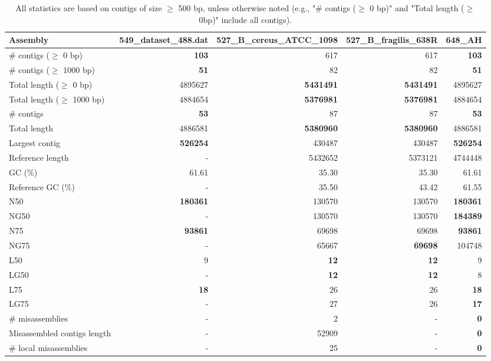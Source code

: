 \documentclass[12pt,a4paper]{article}
\begin{document}
\begin{table}[ht]
\begin{center}
\caption{All statistics are based on contigs of size $\geq$ 500 bp, unless otherwise noted (e.g., "\# contigs ($\geq$ 0 bp)" and "Total length ($\geq$ 0bp)" include all contigs).}
\begin{tabular}{|l*{4}{|r}|}
\hline
Assembly & 549\_dataset\_488.dat & 527\_B\_cereus\_ATCC\_1098 & 527\_B\_fragilis\_638R & 648\_AH \\ \hline
\# contigs ($\geq$ 0 bp) & {\bf 103} & 617 & 617 & {\bf 103} \\ \hline
\# contigs ($\geq$ 1000 bp) & {\bf 51} & 82 & 82 & {\bf 51} \\ \hline
Total length ($\geq$ 0 bp) & 4895627 & {\bf 5431491} & {\bf 5431491} & 4895627 \\ \hline
Total length ($\geq$ 1000 bp) & 4884654 & {\bf 5376981} & {\bf 5376981} & 4884654 \\ \hline
\# contigs & {\bf 53} & 87 & 87 & {\bf 53} \\ \hline
Total length & 4886581 & {\bf 5380960} & {\bf 5380960} & 4886581 \\ \hline
Largest contig & {\bf 526254} & 430487 & 430487 & {\bf 526254} \\ \hline
Reference length & - & 5432652 & 5373121 & 4744448 \\ \hline
GC (\%) & 61.61 & 35.30 & 35.30 & 61.61 \\ \hline
Reference GC (\%) & - & 35.50 & 43.42 & 61.55 \\ \hline
N50 & {\bf 180361} & 130570 & 130570 & {\bf 180361} \\ \hline
NG50 & - & 130570 & 130570 & {\bf 184389} \\ \hline
N75 & {\bf 93861} & 69698 & 69698 & {\bf 93861} \\ \hline
NG75 & - & 65667 & {\bf 69698} & 104748 \\ \hline
L50 & 9 & {\bf 12} & {\bf 12} & 9 \\ \hline
LG50 & - & {\bf 12} & {\bf 12} & 8 \\ \hline
L75 & {\bf 18} & 26 & 26 & {\bf 18} \\ \hline
LG75 & - & 27 & 26 & {\bf 17} \\ \hline
\# misassemblies & - & 2 & - & {\bf 0} \\ \hline
Misassembled contigs length & - & 52909 & - & {\bf 0} \\ \hline
\# local misassemblies & - & 25 & - & {\bf 0} \\ \hline

\end{tabular}
\end{center}
\end{table}
\end{document}
